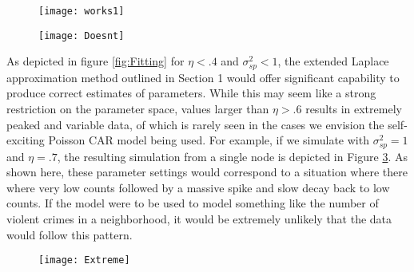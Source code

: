 \documentclass[11pt]{isuthesis}
\begin{document}
		\begin{figure}[!htp]
			\centering
				\texttt{[image: works1]}
				\label{fig:gii terms}
			\end{figure}
			\begin{figure}[!htp]
				\centering
				\texttt{[image: Doesnt]}
			\label{fig:gii terms2}
		\end{figure}
	
	
	
	As depicted in figure \ref{fig:Fitting} for $\eta < .4$ and $\sigma_{sp}^2<1$, the extended Laplace approximation method outlined in Section 1 would offer significant capability to produce correct estimates of parameters.  While this may seem like a strong restriction on the parameter space, values larger than $\eta> .6$ results in extremely peaked and variable data, of which is rarely seen in the cases we envision the self-exciting Poisson CAR model being used.  For example, if we simulate with $\sigma_{sp}^2=1$ and $\eta=.7$, the resulting simulation from a single node is depicted in Figure \ref{fig:Extreme}.  As shown here, these parameter settings would correspond to a situation where there where very low counts followed by a massive spike and slow decay back to low counts.  If the model were to be used to model something like the number of violent crimes in a neighborhood, it would be extremely unlikely that the data would follow this pattern.
	
	\begin{figure}[!htp]
		\centering
		\texttt{[image: Extreme]}
		\label{fig:Extreme}
	\end{figure}
	
\end{document}

